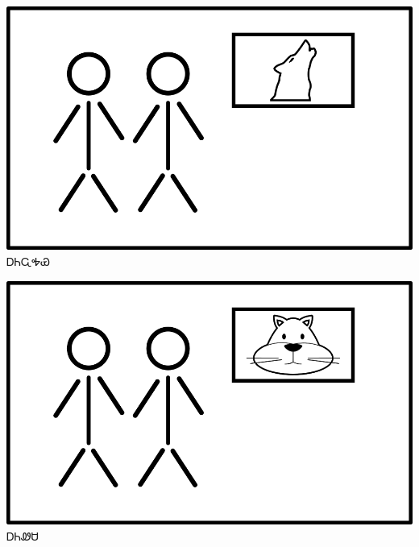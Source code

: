 \documentclass[avery5371,frame]{flashcards}%
\begin{document}
\begin{flashcard}{
\includegraphics[width=0.95\columnwidth,height=.51\columnwidth,keepaspectratio]{../artwork/flags/aniwahaya-flag}
}
\Huge ᎠᏂᏩᎭᏯ
\end{flashcard}
\begin{flashcard}{
\includegraphics[width=0.95\columnwidth,height=.51\columnwidth,keepaspectratio]{../artwork/flags/aniwesa-flag}
}
\Huge ᎠᏂᏪᏌ
\end{flashcard}
\end{document}
